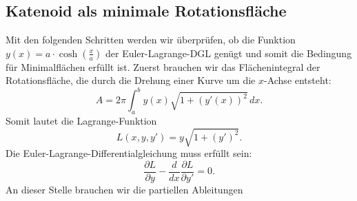 \subsection{Katenoid als minimale Rotationsfläche
	\label{Das Katenoid:subsection:Katenoid als minimale Rotationsfläche}}
Mit den folgenden Schritten werden wir überprüfen, ob die Funktion  \( y(x) = a \cdot \cosh \left( \frac{x}{a} \right) \) der Euler-Lagrange-DGL genügt und somit die Bedingung für Minimalflächen erfüllt ist.
Zuerst brauchen wir das Flächenintegral der Rotationsfläche, die durch die Drehung einer Kurve um die $x$-Achse entsteht:
%
\begin{equation}
	A = 2\pi \int_{a}^{b} y(x) \sqrt{1 + (y'(x))^2} \,dx.
\end{equation}
Somit lautet die Lagrange-Funktion 
\begin{equation}
	L(x, y, y') = y \sqrt{1 + (y')^2}.	
\end{equation}
Die Euler-Lagrange-Differentialgleichung muss erfüllt sein: 
\begin{equation}
	\frac{\partial L}{\partial y} - \frac{d}{dx}  \frac{\partial L}{\partial y'} = 0.
\end{equation}
An dieser Stelle brauchen wir die partiellen Ableitungen

